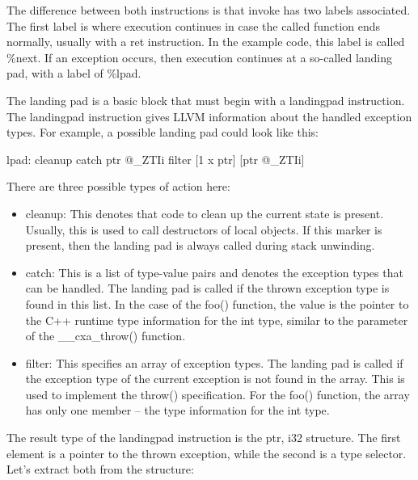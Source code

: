 The difference between both instructions is that invoke has two labels associated. The first label is where execution continues in case the called function ends normally, usually with a ret instruction. In the example code, this label is called \%next. If an exception occurs, then execution continues at a so-called landing pad, with a label of \%lpad.

The landing pad is a basic block that must begin with a landingpad instruction. The landingpad instruction gives LLVM information about the handled exception types. For example, a possible landing pad could look like this:

\begin{shell}
lpad:
            cleanup
            catch ptr @_ZTIi
            filter [1 x ptr] [ptr @_ZTIi]
\end{shell}

There are three possible types of action here:

\begin{itemize}
\item
cleanup: This denotes that code to clean up the current state is present. Usually, this is used to call destructors of local objects. If this marker is present, then the landing pad is always called during stack unwinding.

\item
catch: This is a list of type-value pairs and denotes the exception types that can be handled. The landing pad is called if the thrown exception type is found in this list. In the case of the foo() function, the value is the pointer to the C++ runtime type information for the int type, similar to the parameter of the \_\_cxa\_throw() function.

\item
filter: This specifies an array of exception types. The landing pad is called if the exception type of the current exception is not found in the array. This is used to implement the throw() specification. For the foo() function, the array has only one member – the type information for the int type.
\end{itemize}

The result type of the landingpad instruction is the { ptr, i32 } structure. The first element is a pointer to the thrown exception, while the second is a type selector. Let’s extract both from the structure:

\begin{shell}
\end{shell}

